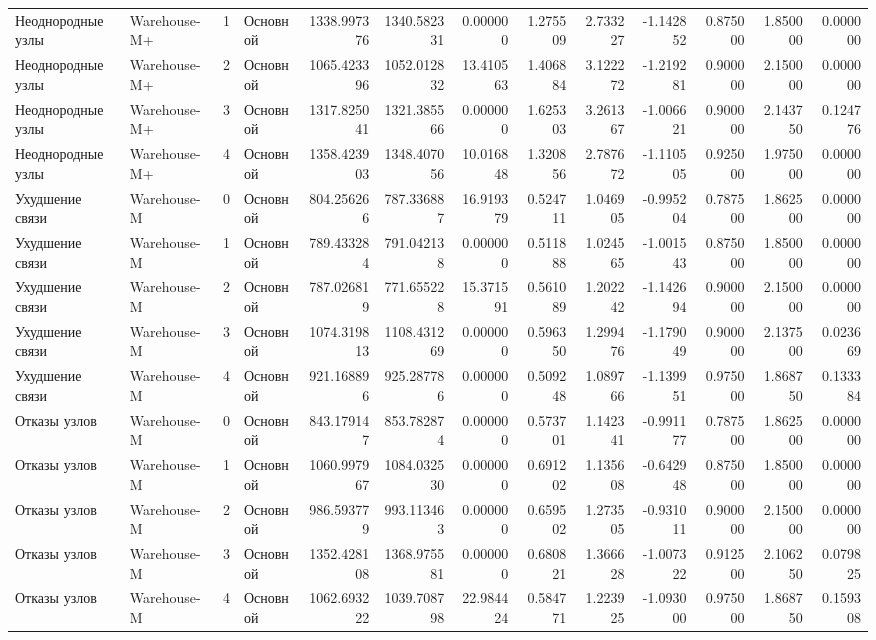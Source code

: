 \begin{tabular}{llrlrrrrrrrrr}
 Неоднородные узлы & Warehouse-M+ & 1 & Основной & 1338.997376 & 1340.582331 & 0.000000 & 1.275509 & 2.733227 & -1.142852 & 0.875000 & 1.850000 & 0.000000 \\
 Неоднородные узлы & Warehouse-M+ & 2 & Основной & 1065.423396 & 1052.012832 & 13.410563 & 1.406884 & 3.122272 & -1.219281 & 0.900000 & 2.150000 & 0.000000 \\
 Неоднородные узлы & Warehouse-M+ & 3 & Основной & 1317.825041 & 1321.385566 & 0.000000 & 1.625303 & 3.261367 & -1.006621 & 0.900000 & 2.143750 & 0.124776 \\
 Неоднородные узлы & Warehouse-M+ & 4 & Основной & 1358.423903 & 1348.407056 & 10.016848 & 1.320856 & 2.787672 & -1.110505 & 0.925000 & 1.975000 & 0.000000 \\
 Ухудшение связи & Warehouse-M & 0 & Основной & 804.256266 & 787.336887 & 16.919379 & 0.524711 & 1.046905 & -0.995204 & 0.787500 & 1.862500 & 0.000000 \\
 Ухудшение связи & Warehouse-M & 1 & Основной & 789.433284 & 791.042138 & 0.000000 & 0.511888 & 1.024565 & -1.001543 & 0.875000 & 1.850000 & 0.000000 \\
 Ухудшение связи & Warehouse-M & 2 & Основной & 787.026819 & 771.655228 & 15.371591 & 0.561089 & 1.202242 & -1.142694 & 0.900000 & 2.150000 & 0.000000 \\
 Ухудшение связи & Warehouse-M & 3 & Основной & 1074.319813 & 1108.431269 & 0.000000 & 0.596350 & 1.299476 & -1.179049 & 0.900000 & 2.137500 & 0.023669 \\
 Ухудшение связи & Warehouse-M & 4 & Основной & 921.168896 & 925.287786 & 0.000000 & 0.509248 & 1.089766 & -1.139951 & 0.975000 & 1.868750 & 0.133384 \\
 Отказы узлов & Warehouse-M & 0 & Основной & 843.179147 & 853.782874 & 0.000000 & 0.573701 & 1.142341 & -0.991177 & 0.787500 & 1.862500 & 0.000000 \\
 Отказы узлов & Warehouse-M & 1 & Основной & 1060.997967 & 1084.032530 & 0.000000 & 0.691202 & 1.135608 & -0.642948 & 0.875000 & 1.850000 & 0.000000 \\
 Отказы узлов & Warehouse-M & 2 & Основной & 986.593779 & 993.113463 & 0.000000 & 0.659502 & 1.273505 & -0.931011 & 0.900000 & 2.150000 & 0.000000 \\
 Отказы узлов & Warehouse-M & 3 & Основной & 1352.428108 & 1368.975581 & 0.000000 & 0.680821 & 1.366628 & -1.007322 & 0.912500 & 2.106250 & 0.079825 \\
 Отказы узлов & Warehouse-M & 4 & Основной & 1062.693222 & 1039.708798 & 22.984424 & 0.584771 & 1.223925 & -1.093000 & 0.975000 & 1.868750 & 0.159308 \\

\end{tabular}

